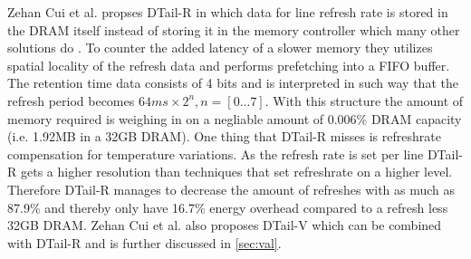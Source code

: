 Zehan Cui et al. \cite{dtail} propses DTail-R in which data for line refresh rate is stored in the DRAM itself instead of storing it in the memory controller which many other solutions do \cite{raidr}\cite{smartrefresh}\cite{refrint}. To counter the added latency of a slower memory they utilizes spatial locality of the refresh data and performs prefetching into a FIFO buffer. The retention time data consists of 4 bits and is interpreted in such way that the refresh period becomes \(64ms \times 2^n, n = [0...7]\). With this structure the amount of memory required is weighing in on a negliable amount of 0.006\% DRAM capacity (i.e. 1.92MB in a 32GB DRAM). One thing that DTail-R misses is refreshrate compensation for temperature variations. As the refresh rate is set per line DTail-R gets a higher resolution than techniques that set refreshrate on a higher level. Therefore DTail-R manages to decrease the amount of refreshes with as much as 87.9\% and thereby only have 16.7\% energy overhead compared to a refresh less 32GB DRAM. Zehan Cui et al. also proposes DTail-V \cite{dtail} which can be combined with DTail-R and is further discussed in \ref{sec:val}.